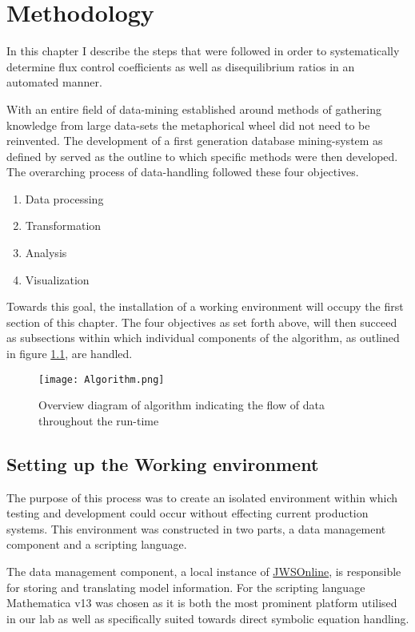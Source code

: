 \chapter{Methodology} \label{chp:3}
In this chapter I describe the steps that were followed in order to systematically determine flux control coefficients as well as disequilibrium ratios in an automated manner. 

With an entire field of data-mining established around methods of gathering knowledge from large data-sets the metaphorical wheel did not need to be reinvented. The development of a first generation database mining-system as defined by \citeauthor{Imielinski1996, Radivojac2004, Uppalaiah2012} served as the outline to which specific methods were then developed. The overarching process of data-handling followed these four objectives.

\begin{enumerate}
\item Data processing
\item Transformation
\item Analysis
\item Visualization
\end{enumerate} 

Towards this goal, the installation of a working environment will occupy the first section of this chapter. The four objectives as set forth above, will then succeed as subsections within which individual components of the algorithm, as outlined in figure \ref{Algorithm}, are handled. 

\begin{figure}[h] 
\texttt{[image: Algorithm.png]}
\centering
\caption{Overview diagram of algorithm indicating the flow of data throughout the run-time}
\label{Algorithm}
\end{figure}

\section{Setting up the Working environment} \label{Working Environment}
The purpose of this process was to create an isolated environment within which testing and development could occur without effecting current production systems. This environment was constructed in two parts, a data management component and a scripting language. 

The data management component, a local instance of \href{https://jjj.bio.vu.nl}{JWSOnline}, is responsible for storing and translating model information. For the scripting language Mathematica v13 was chosen as it is both the most prominent platform utilised in our lab as well as specifically suited towards direct symbolic equation handling. 

